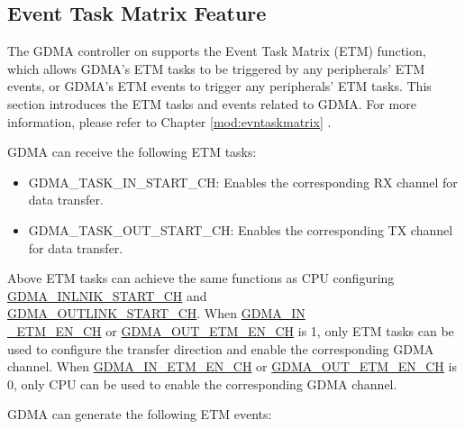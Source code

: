\documentclass[main\_\_EN.tex]{subfiles}
\begin{document}
\subsection{Event Task Matrix Feature}\label{sec:dma-etm-func}

The GDMA controller on \chipname{} supports the Event Task Matrix (ETM) function, which allows GDMA's ETM tasks to be triggered by any peripherals' ETM events, or GDMA's ETM events to trigger any peripherals' ETM tasks. This section introduces the ETM tasks and events related to GDMA. For more information, please refer to Chapter \ref{mod:evntaskmatrix} .

GDMA can receive the following ETM tasks:

\begin{itemize}
    \item GDMA\_TASK\_IN\_START\_CH: Enables the corresponding RX channel  for data transfer.
    \item GDMA\_TASK\_OUT\_START\_CH: Enables the corresponding TX channel  for data transfer.
\end{itemize}

\begin{tiplisting}
Above ETM tasks can achieve the same functions as CPU configuring \hyperref[fielddesc:GDMAINLINKSTARTCHN]{GDMA\_INLNIK\_START\_CH} and \\\hyperref[fielddesc:GDMAOUTLINKSTARTCHN]{GDMA\_OUTLINK\_START\_CH}. When \hyperref[fielddesc:GDMAINETMENCHN]{GDMA\_IN\\\_ETM\_EN\_CH}  or \hyperref[fielddesc:GDMAOUTETMENCHN]{GDMA\_OUT\_ETM\_EN\_CH} is 1, only ETM tasks can be used to configure the transfer direction and enable the corresponding GDMA channel. When \hyperref[fielddesc:GDMAINETMENCHN]{GDMA\_IN\_ETM\_EN\_CH} or \hyperref[fielddesc:GDMAOUTETMENCHN]{GDMA\_OUT\_ETM\_EN\_CH} is 0, only CPU can be used to enable the corresponding GDMA channel.
\end{tiplisting}

GDMA can generate the following ETM events:
\end{document}
